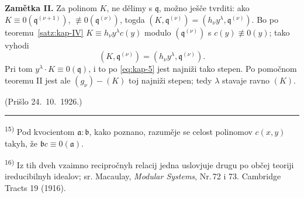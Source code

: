 \documentclass[11pt]{article}
\newcommand{\foreign}[1]{#1}
\theoremstyle{plain}
\begin{document}
\textbf{Zamětka II.} Za polinom $K$, ne dělimy s $\mathfrak{q}$,
možno ješče tvrditi: ako
$K \equiv 0(\mathfrak{q}^{(\nu+1)})$,
$\not\equiv 0(\mathfrak{q}^{(\nu)})$, togda
$(K, \mathfrak{q}^{(\nu)}) = (h_{\nu}y^{\lambda}, \mathfrak{q}^{(\nu)})$.
Bo po teoremu~\ref{satz:kap-IV}
$K \equiv h_{\nu}y^{\lambda}c(y)$ modulo
$(\mathfrak{q}^{(\nu)})$ s $c(y) \not\equiv 0(y)$; tako vyhodi
\[
(K, \mathfrak{q}^{(\nu)}) = (h_{\nu}y^{\lambda}, \mathfrak{q}^{(\nu)}).
\]
Pri tom $y^{\lambda} \cdot K \equiv 0(\mathfrak{q})$, i to po
\eqref{eq:kap-5} jest najniži tako stepen. Po pomočnom teoremu II
jest ale $(g_{\nu}) - (K)$ toj najniži stepen; tedy $\lambda$ stavaje
ravno $(K)$.

\vfill
\begin{flushright}
(Prišlo 24.\ 10.\ 1926.)
\end{flushright}

\vspace{0.5em}
\noindent\rule{\textwidth}{0.4pt}
\vspace{0.3em}

{\footnotesize
\textsuperscript{15)} Pod kvocientom $\mathfrak{a}:\mathfrak{b}$, kako poznano,
razuměje se celost polinomov $c(x,y)$ takyh, že
$\mathfrak{b}c \equiv 0(\mathfrak{a})$.

\textsuperscript{16)} Iz tih dveh vzaimno recipročnyh relacij jedna uslovjuje
drugu po občej teoriji ireducibilnyh idealov; sr. Macaulay,
\textit{Modular Systems}, Nr.\,72 i 73. \foreign{Cambridge Tracts} 19 (1916).
}
\end{document}
